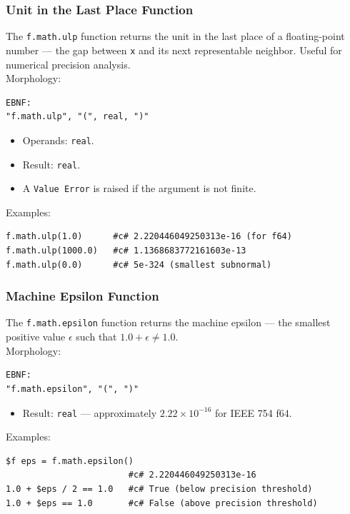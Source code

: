 \subsubsection{Unit in the Last Place Function}
The \texttt{f.math.ulp} function returns the unit in the last place of a floating-point number --- the gap between \texttt{x} and its next representable neighbor. Useful for numerical precision analysis. \\
Morphology:
\begin{verbatim}
EBNF:
"f.math.ulp", "(", real, ")"
\end{verbatim}
\begin{itemize}
\item Operands: \texttt{real}.
\item Result: \texttt{real}.
\item A \texttt{Value Error} is raised if the argument is not finite.
\end{itemize}
Examples:
\begin{verbatim}
f.math.ulp(1.0)      #c# 2.220446049250313e-16 (for f64)
f.math.ulp(1000.0)   #c# 1.1368683772161603e-13
f.math.ulp(0.0)      #c# 5e-324 (smallest subnormal)
\end{verbatim}

\subsubsection{Machine Epsilon Function}
The \texttt{f.math.epsilon} function returns the machine epsilon --- the smallest positive value $\epsilon$ such that $1.0 + \epsilon \neq 1.0$. \\
Morphology:
\begin{verbatim}
EBNF:
"f.math.epsilon", "(", ")"
\end{verbatim}
\begin{itemize}
\item Result: \texttt{real} --- approximately $2.22 \times 10^{-16}$ for IEEE 754 f64.
\end{itemize}
Examples:
\begin{verbatim}
$f eps = f.math.epsilon()
                        #c# 2.220446049250313e-16
1.0 + $eps / 2 == 1.0   #c# True (below precision threshold)
1.0 + $eps == 1.0       #c# False (above precision threshold)
\end{verbatim}


